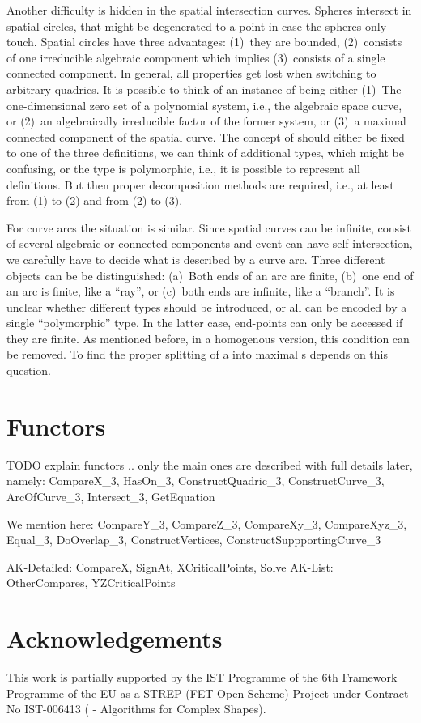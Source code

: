 Another difficulty is hidden in the spatial intersection curves.
Spheres intersect in spatial circles, that might be degenerated
to a point in case the spheres only touch. Spatial circles
have three advantages: (1)~they are bounded, (2)~consists of one irreducible
algebraic component which implies (3)~consists of a single
connected component.
In general, all properties get lost when switching to arbitrary quadrics.
It is possible to think of an instance of  being either
(1)~The one-dimensional zero set of a polynomial
system, i.e., the algebraic space curve, or (2)~an algebraically 
irreducible factor of the former system, or (3)~a maximal connected component
of the spatial curve. 
The concept of  should either be fixed to one of the
three definitions, we can think of additional types, which might be
confusing, or the type is polymorphic, i.e., it is possible
to represent all definitions. But then proper decomposition
methods are required, i.e., at least from (1) to (2) and from (2) to (3).

For curve arcs the situation is similar. Since spatial curves can be infinite,
consist of several algebraic or connected components and event can have 
self-intersection, we carefully have to decide what is described by a curve
arc. Three different objects can be be distinguished: (a)~Both ends of an 
arc are finite, (b)~one end of an arc is finite, like a ``ray'', or 
(c)~both ends are infinite, like a ``branch''. It is unclear
whether different types should be introduced, or
all can be encoded by a single ``polymorphic'' type. In the latter
case, end-points can only be accessed if they are finite. As mentioned before,
in a homogenous version, this condition can be removed. To find the 
proper splitting of a  into maximal s depends
on this question.

\section{Functors}

TODO explain functors .. only the main ones are described with full details 
later, namely: CompareX\_3, HasOn\_3, ConstructQuadric\_3, ConstructCurve\_3,
ArcOfCurve\_3, Intersect\_3, GetEquation



We mention here: CompareY\_3, CompareZ\_3, CompareXy\_3, CompareXyz\_3,
Equal\_3, DoOverlap\_3, ConstructVertices, ConstructSuppportingCurve\_3


AK-Detailed: CompareX, SignAt, XCriticalPoints, Solve
AK-List: OtherCompares, YZCriticalPoints


\section{Acknowledgements}

This work is partially supported by the IST Programme of the 6th
Framework Programme of the EU as a STREP (FET Open Scheme) Project
under Contract No IST-006413 ( -
Algorithms for Complex Shapes).
